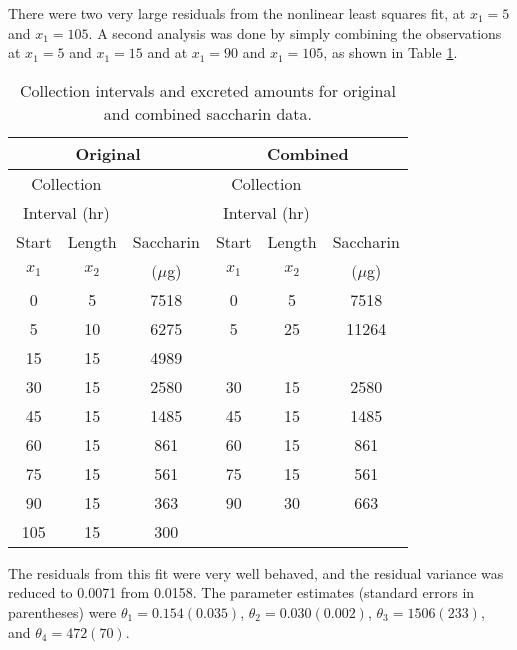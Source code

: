 \begin{example}
  There were two very large residuals from the nonlinear least
  squares fit, at $x_1=5$ and $x_1=105$.
  A second analysis was done by simply combining the observations
  at $x_1=5$ and  $x_1=15$ and at
  $x_1=90$ and $x_1=105$, as shown in Table \ref{tbl:SACHed}.
  \begin{table}
    \caption{
      Collection intervals and excreted amounts for original and
      combined saccharin data.  }\label{tbl:SACHed}
    \begin{center}
      \begin{tabular}{cccccc} \hline
        \multicolumn{3}{c}{Original} & \multicolumn{3}{c}{Combined}\\
        \hline \multicolumn{2}{c}{Collection} & &
        \multicolumn{2}{c}{Collection} &\\ \multicolumn{2}{c}{Interval (hr)}
        & & \multicolumn{2}{c}{Interval (hr)} & \\ \multicolumn{1}{c}{Start}
        & \multicolumn{1}{c}{Length} & \multicolumn{1}{c}{Saccharin} &
        \multicolumn{1}{c}{Start} & \multicolumn{1}{c}{Length} &
        \multicolumn{1}{c}{Saccharin}\\ \multicolumn{1}{c}{$x_{1}$} &
        \multicolumn{1}{c}{$x_{2}$} & \multicolumn{1}{c}{$(\mu$g)} &
        \multicolumn{1}{c}{$x_{1}$} & \multicolumn{1}{c}{$x_{2}$} &
        \multicolumn{1}{c}{$(\mu$g)}\\ \hline 0&5&7518&0&5&7518\\
        5&10&6275&5&25&11264\\ 15&15&4989&\\ 30&15&2580&30&15&2580\\
        45&15&1485&45&15&1485\\ 60&15&861&60&15&861\\ 75&15&561&75&15&561\\
        90&15&363&90&30&663\\ 105&15&300\\ \hline
      \end{tabular}
    \end{center}
  \end{table}
  
  The residuals from this fit were very well behaved, and the
  residual variance was reduced to 0.0071 from 0.0158.
  The parameter estimates (standard errors in parentheses) were
  $\theta_1 = 0.154 (0.035)$,
  $\theta_2 = 0.030 (0.002)$,
  $\theta_3 = 1506  (233)$, and
  $\theta_4 =  472 (70)$.
\end{example}

